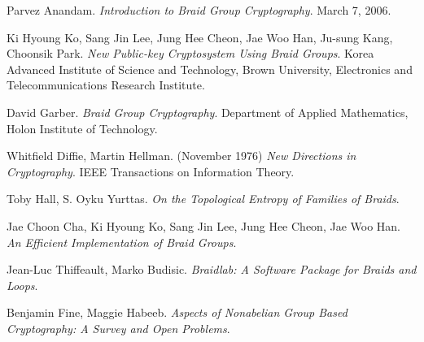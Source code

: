 \documentclass{article}
\theoremstyle{definition}
\begin{document}
\begin{thebibliography}{9}

Parvez Anandam. 
\textit{Introduction to Braid Group Cryptography}. 
March 7, 2006.
 
Ki Hyoung Ko, Sang Jin Lee, Jung Hee Cheon, Jae Woo Han, Ju-sung Kang, Choonsik Park.
\textit{New Public-key Cryptosystem Using Braid Groups}.
Korea Advanced Institute of Science and Technology, Brown University, Electronics and Telecommunications Research Institute. 

David Garber.
\textit{Braid Group Cryptography}.
Department of Applied Mathematics, Holon Institute of Technology. 
 
Whitfield Diffie, Martin Hellman. (November 1976)
\textit{New Directions in Cryptography}.
IEEE Transactions on Information Theory.


Toby Hall, S. Oyku Yurttas.
\textit{On the Topological Entropy of Families of Braids}.

Jae Choon Cha, Ki Hyoung Ko, Sang Jin Lee, Jung Hee Cheon, Jae Woo Han.
\textit{An Efficient Implementation of Braid Groups}.

Jean-Luc Thiffeault, Marko Budisic.
\textit{Braidlab: A Software Package for Braids and Loops}.

Benjamin Fine, Maggie Habeeb. 
\textit{Aspects of Nonabelian Group Based Cryptography: A Survey and Open Problems}.

\end{thebibliography}






	
\end{document}

